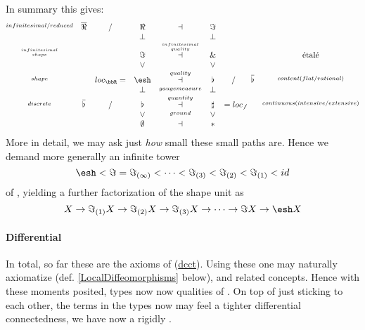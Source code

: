 In summary this gives:
\begin{displaymath}
\itexarray{
\stackrel{infinitesimal/reduced}{} &\overline{\Re} & / & \Re &\dashv& \Im &  &  &
\\
&& & \bot && \bot
\\
\stackrel{infinitesimal \atop shape}{} && & \Im
&\stackrel{infinitesimal \atop quality}{\dashv}& \& & && \text{étalé}
\\
&& & \vee && \vee
\\
\stackrel{shape}{} && loc_{\bbR} =& \esh  &\stackrel{quality}{\dashv}& \flat & / & \overline{\flat}&  \stackrel{content(flat/rational)}{}
\\
&& & \bot &\stackrel{gaugemeasure}{}& \bot
\\
\stackrel{discrete}{} &\overline{\flat}& / & \flat &\stackrel{quantity}{\dashv}& \sharp & = loc_{\not\not}  &   & \stackrel{continuous (intensive/extensive)}{}
\\
&& & \vee &\stackrel{ground}{}& \vee
\\
&& & \emptyset &\dashv& \ast &
}
\end{displaymath}
More in detail, we may ask just \emph{how} small these small paths are. Hence we demand more generally an infinite tower
\begin{displaymath}
\esh 
\lt
\Im
=
\Im_{(\infty)}
\lt
\cdots
\lt
\Im_{(3)}
\lt
\Im_{(2)}
\lt
\Im_{(1)}
\lt
id
\end{displaymath}
of , yielding a further factorization of the shape unit as
\begin{displaymath}
X \to \Im_{(1)}X \to \Im_{(2)}X 
\to \Im_{(3)} X  \to \cdots \to \Im X \to \esh  X
\end{displaymath}
\hypertarget{differential}{}\paragraph*{{Differential}}\label{differential}
In total, so far these are the axioms of  (\hyperlink{dcct}{dcct}). Using these one may naturally axiomatize  (def. \ref{LocalDiffeomorphisms} below),  and related concepts.
Hence with these moments posited, types now now qualities of . On top of just  sticking to each other, the terms in the types now may feel a tighter differential connectedness, we have now a rigidly  .
